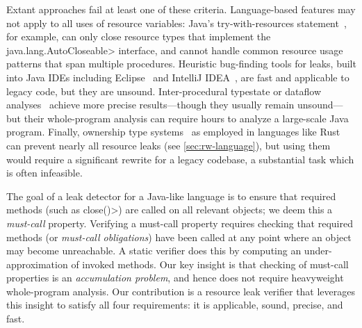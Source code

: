 \noindent
Extant approaches fail at least one of these criteria.
Language-based features may not apply to all uses of resource variables:
Java's try-with-resources statement~\cite{try-with-resources}, for example, can
only close resource types that implement the \<java.lang.AutoCloseable> interface,
and cannot handle
common resource usage patterns that span multiple procedures. 
Heuristic bug-finding tools for leaks, built into Java IDEs including
Eclipse~\cite{ecj-resource-leak} and IntelliJ
IDEA~\cite{idea-resource-leak}, 
are fast and applicable to legacy
code, but they are unsound.
Inter-procedural typestate or dataflow analyses~\cite{TorlakC10,zuo2019grapple}
achieve more precise
results---though they usually remain unsound---but
their whole-program analysis can require hours to analyze a large-scale Java program.
Finally, ownership type
systems~\cite{clarke2013ownership} as employed in languages like
Rust~\cite{klabnik2018rust} can prevent nearly all resource leaks (see
\cref{sec:rw-language}), but using them would require a significant rewrite for
a legacy codebase, a substantial task which is often infeasible.

The goal of a leak detector for a Java-like language is to ensure that required
methods (such as \<close()>) are called on all relevant objects; we deem this
a \emph{must-call} property.  Verifying a must-call property requires
checking that required methods (or \emph{must-call obligations}) have been
called at any point where an object may become unreachable.  A static
verifier does this by computing an
under-approximation of invoked methods.  Our key insight is that checking of
must-call properties is an \emph{accumulation problem}, and hence does not
require heavyweight whole-program analysis. Our contribution is a resource leak
verifier that leverages this insight to satisfy all four requirements: it is
applicable, sound, precise, and fast.

